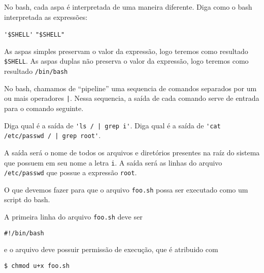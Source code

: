 \begin{Exercise}[label={0023}, difficulty={0}, origin={bash}]
  No bash, cada aspa é interpretada de uma maneira diferente. Diga como o bash
  interpretada as expressões:

  \Question \lstinline+'$SHELL'+
  \Question \lstinline+"$SHELL"+
\end{Exercise}
\begin{Answer}[ref={0023}]
  \Question As aspas simples preservam o valor da expressão, logo teremos como
  resultado \lstinline+$SHELL+.
  \Question As aspas duplas não preserva o valor da expressão, logo teremos como
  resultado \lstinline+/bin/bash+
\end{Answer}

\begin{Exercise}[label={0024}, difficulty={0}, origin={bash}]
  No bash, chamamos de ``pipeline'' uma sequencia de comandos separados por um
  ou mais operadores \lstinline+|+. Nessa sequencia, a saída de cada comando
  serve de entrada para o comando seguinte.

  \Question Diga qual é a saída de \lstinline+'ls / | grep i'+.
  \Question Diga qual é a saída de \lstinline+'cat /etc/passwd / | grep root'+.
\end{Exercise}
\begin{Answer}[ref={0023}]
  \Question A saída será o nome de todos os arquivos e diretórios presentes na
  raíz do sistema que possuem em seu nome a letra \lstinline+i+.
  \Question A saída será as linhas do arquivo \lstinline+/etc/passwd+ que possue
  a expressão \lstinline+root+.
\end{Answer}

\begin{Exercise}[label={0024}, difficulty={0}, origin={bash}]
  O que devemos fazer para que o arquivo \lstinline+foo.sh+ possa ser executado
  como um script do bash.
\end{Exercise}
\begin{Answer}[ref={0024}]
  A primeira linha do arquivo \lstinline+foo.sh+ deve ser
  \begin{lstlisting}
#!/bin/bash
  \end{lstlisting}
  e o arquivo deve possuir permissão de execução, que é atribuido com
  \begin{lstlisting}
$ chmod u+x foo.sh
  \end{lstlisting}
\end{Answer}

